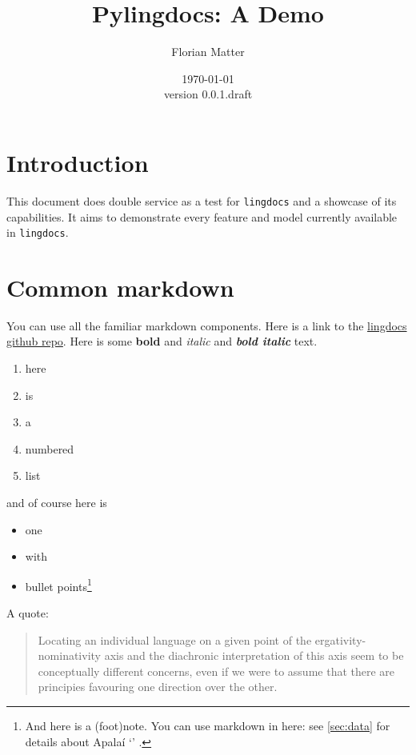 \documentclass{article}
\title{Pylingdocs: A Demo}
\author{Florian Matter}
\date{\today\\version 0.0.1.draft}
\begin{document}
\maketitle

\tableofcontents


\section{\texorpdfstring{Introduction \label{sec:intro}}{Introduction }}

This document does double service as a test for \texttt{lingdocs} and a
showcase of its capabilities. It aims to demonstrate every feature and
model currently available in \texttt{lingdocs}.

\section{\texorpdfstring{Common
markdown\label{common-markdown}}{Common markdown}}

You can use all the familiar markdown components. Here is a link to the
\href{https://github.com/fmatter/lingdocs/}{lingdocs github repo}. Here
is some \textbf{bold} and \emph{italic} and \textbf{\emph{bold italic}}
text.

\begin{enumerate}
\def\labelenumi{\arabic{enumi}.}
\tightlist
\item
  here
\item
  is
\item
  a
\item
  numbered
\item
  list
\end{enumerate}

and of course here is

\begin{itemize}
\tightlist
\item
  one
\item
  with
\item
  bullet points\footnote{And here is a (foot)note. You can use markdown
    in here: see \cref{sec:data} for details about Apalaí 
    `' \parencites[77]{koehn1986apalai}.}
\end{itemize}

A quote:

\begin{quote}
Locating an individual language on a given point of the
ergativity-nominativity axis and the diachronic interpretation of this
axis seem to be conceptually different concerns, even if we were to
assume that there are principies favouring one direction over the other.
\parencites[71]{alvarez1998split}
\end{quote}
\end{document}
